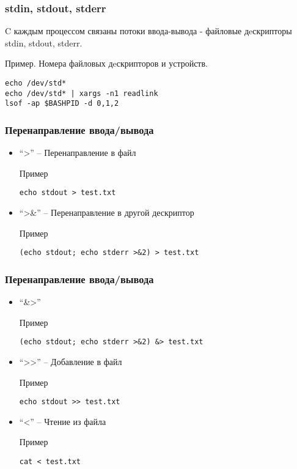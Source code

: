 
\begin{frame}[fragile]
	\frametitle{stdin, stdout, stderr}
     C каждым процессом связаны потоки ввода-вывода - файловые дeскрипторы stdin, stdout, stderr.
    \begin{block}{Пример. Номера файловых дeскрипторов и устройств. }
                    \begin{lstlisting}
echo /dev/std*
echo /dev/std* | xargs -n1 readlink
lsof -ap $BASHPID -d 0,1,2
                    \end{lstlisting}
    \end{block}
\end{frame}

\begin{frame}[fragile]
	\frametitle{Перенаправление ввода/вывода}

	\begin{itemize}
		\item ``>'' -- Перенаправление в файл
			\begin{block}{Пример}
				\begin{lstlisting}
echo stdout > test.txt
				\end{lstlisting}
			\end{block}
		\item ``>\&'' -- Перенаправление в другой дескриптор
			\begin{block}{Пример}
				\begin{lstlisting}
(echo stdout; echo stderr >&2) > test.txt
				\end{lstlisting}
			\end{block}
	\end{itemize}

\end{frame}



\begin{frame}[fragile]
	\frametitle{Перенаправление ввода/вывода}

	\begin{itemize}

		\item ``\&>''
			\begin{block}{Пример}
				\begin{lstlisting}
(echo stdout; echo stderr >&2) &> test.txt
				\end{lstlisting}
			\end{block}
		
		\item ``>{}>'' -- Добавление в файл
			\begin{block}{Пример}
				\begin{lstlisting}
echo stdout >> test.txt
				\end{lstlisting}
			\end{block}

		\item ``<'' -- Чтение из файла
			\begin{block}{Пример}
				\begin{lstlisting}
cat < test.txt
				\end{lstlisting}
			\end{block}
	\end{itemize}

\end{frame}



